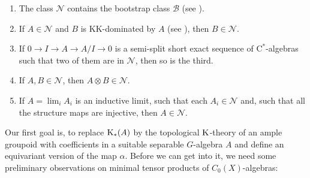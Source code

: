 	\begin{enumerate}
		\item The class $\mathcal{N}$ contains the bootstrap class $\mathcal{B}$ (see \cite[Definition~22.3.4]{MR1656031}).
		\item If $A\in\mathcal{N}$ and $B$ is $\mathrm{KK}$-dominated by $A$ (see \cite[Definition~23.10.6]{MR1656031}), then $B\in\mathcal{N}$.
		\item If $0\rightarrow I\rightarrow A\rightarrow A/I\rightarrow 0$ is a semi-split short exact sequence of $\mathrm{C}^*$-algebras such that two of them are in $\mathcal{N}$, then so is the third.
		\item If $A,B\in\mathcal{N}$, then $A\otimes B\in\mathcal{N}$.
		\item If $A=\lim_i A_i$ is an inductive limit, such that each $A_i\in\mathcal{N}$ and, such that all the structure maps are injective, then $A\in\mathcal{N}$.
	\end{enumerate}
	
	Our first goal is, to replace $\mathrm K_*(A)$ by the topological $\mathrm K$-theory of an ample groupoid with coefficients in a suitable separable $G$-algebra $A$ and define an equivariant version of the map $\alpha$.
	Before we can get into it, we need some preliminary observations on minimal tensor products of $C_0(X)$-algebras:
	
